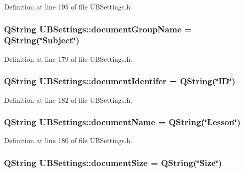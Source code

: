 Definition at line 195 of file U\-B\-Settings.\-h.

\hypertarget{class_u_b_settings_a840d7de55a46ac70210981b48afbea68}{
\subsubsection[{document\-Group\-Name}]{\setlength{\rightskip}{0pt plus 5cm}Q\-String U\-B\-Settings\-::document\-Group\-Name = Q\-String(\char`\"{}Subject\char`\"{})\hspace{0.3cm}{\ttfamily [static]}}}\label{db/d66/class_u_b_settings_a840d7de55a46ac70210981b48afbea68}


Definition at line 179 of file U\-B\-Settings.\-h.

\hypertarget{class_u_b_settings_ae32d2d0d90f473f448ac9fe0570b25cd}{
\subsubsection[{document\-Identifer}]{\setlength{\rightskip}{0pt plus 5cm}Q\-String U\-B\-Settings\-::document\-Identifer = Q\-String(\char`\"{}I\-D\char`\"{})\hspace{0.3cm}{\ttfamily [static]}}}\label{db/d66/class_u_b_settings_ae32d2d0d90f473f448ac9fe0570b25cd}


Definition at line 182 of file U\-B\-Settings.\-h.

\hypertarget{class_u_b_settings_ac835acad66226a9b63347e2ed55fbd13}{
\subsubsection[{document\-Name}]{\setlength{\rightskip}{0pt plus 5cm}Q\-String U\-B\-Settings\-::document\-Name = Q\-String(\char`\"{}Lesson\char`\"{})\hspace{0.3cm}{\ttfamily [static]}}}\label{db/d66/class_u_b_settings_ac835acad66226a9b63347e2ed55fbd13}


Definition at line 180 of file U\-B\-Settings.\-h.

\hypertarget{class_u_b_settings_a8b5d0d32779ae922cf795f6455e9385f}{
\subsubsection[{document\-Size}]{\setlength{\rightskip}{0pt plus 5cm}Q\-String U\-B\-Settings\-::document\-Size = Q\-String(\char`\"{}Size\char`\"{})\hspace{0.3cm}{\ttfamily [static]}}}\label{db/d66/class_u_b_settings_a8b5d0d32779ae922cf795f6455e9385f}


